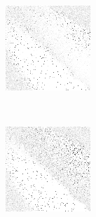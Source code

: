 \begin{figure}
	\begin{subfigure}[t]{0.22\textwidth}
		\center
		\includegraphics[width=\textwidth]{images/findings/experiments/regularization/strats/0.80/crib_min_avg.png}
		\caption{\cribminavg}
	\end{subfigure}
	~
	\begin{subfigure}[t]{0.22\textwidth}
		\center
		\includegraphics[width=\textwidth]{images/findings/experiments/regularization/strats/0.80/pegging_max_avg_gained.png}

\end{subfigure}
\end{figure}
